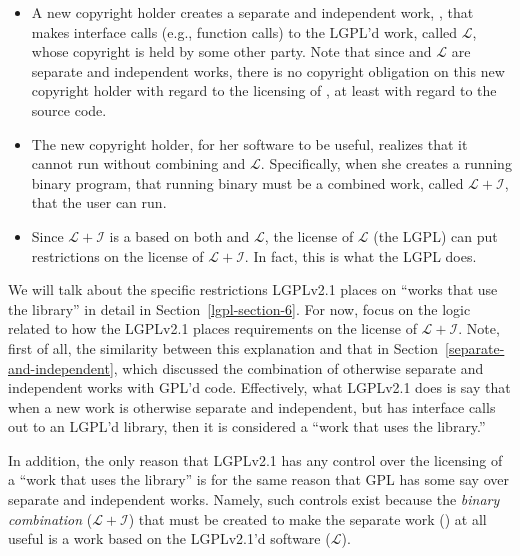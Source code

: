 \newcommand{\workl}{$\mathcal{L}$}
\newcommand{\lplusi}{$\mathcal{L\!\!+\!\!I}$}

\begin{itemize}

\item A new copyright holder creates a separate and independent work,
  \worki{}, that makes interface calls (e.g., function calls) to the
  LGPL'd work, called \workl{}, whose copyright is held by some other
  party. Note that since \worki{} and \workl{} are separate and
  independent works, there is no copyright obligation on this new copyright
  holder with regard to the licensing of \worki{}, at least with regard to
  the source code.

\item The new copyright holder, for her software to be useful, realizes
  that it cannot run without combining \worki{} and \workl{}.
  Specifically, when she creates a running binary program, that running
  binary must be a combined work, called \lplusi{}, that the user can
  run.

\item Since \lplusi{} is a based on both \worki{} and \workl{},
  the license of \workl{} (the LGPL) can put restrictions on the license
  of \lplusi{}. In fact, this is what the LGPL does.

\end{itemize}

We will talk about the specific restrictions LGPLv2.1 places on ``works
that use the library'' in detail in Section~\ref{lgpl-section-6}. For
now, focus on the logic related to how the LGPLv2.1 places requirements on
the license of \lplusi{}. Note, first of all, the similarity between
this explanation and that in Section~\ref{separate-and-independent},
which discussed the combination of otherwise separate and independent
works with GPL'd code. Effectively, what LGPLv2.1 does is say that when a
new work is otherwise separate and independent, but has interface
calls out to an LGPL'd library, then it is considered a ``work that
uses the library.''

In addition, the only reason that LGPLv2.1 has any control over the licensing
of a ``work that uses the library'' is for the same reason that GPL has
some say over separate and independent works. Namely, such controls exist
because the {\em binary combination\/} (\lplusi{}) that must be created to
make the separate work (\worki{}) at all useful is a  work based on
the LGPLv2.1'd software (\workl{}).

